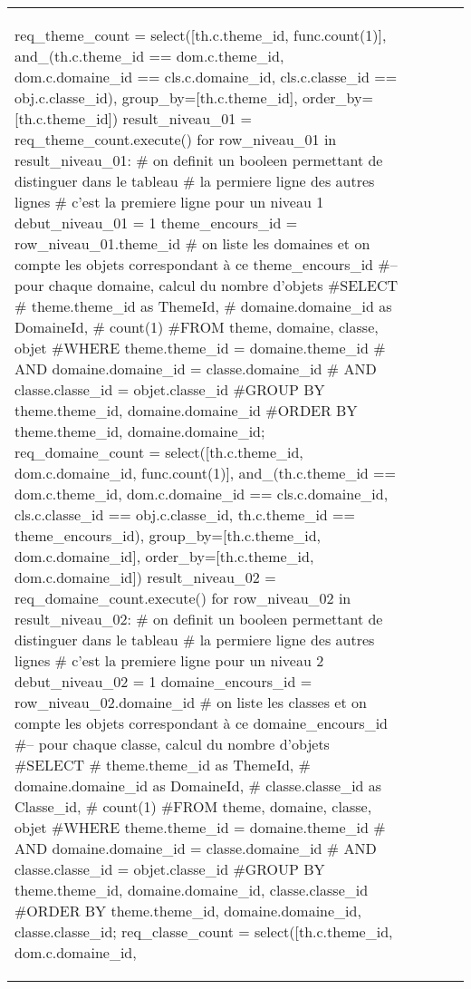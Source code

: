 \documentclass[12pt,titlepage,oneside]{book}
\begin{document}
\begin{supertabular}{|p{7.5cm}|p{7.5cm}|p{7.5cm}|c|p{10cm}|}
\begin{lbdpython}
req_theme_count = select([th.c.theme_id, func.count(1)],
                  and_(th.c.theme_id == dom.c.theme_id,
                       dom.c.domaine_id == cls.c.domaine_id,
                       cls.c.classe_id == obj.c.classe_id),
                  group_by=[th.c.theme_id],
                  order_by=[th.c.theme_id])
result_niveau_01 = req_theme_count.execute()
for row_niveau_01 in result_niveau_01:
   # on definit un booleen permettant de distinguer dans le tableau
   # la permiere ligne des autres lignes
   # c'est la premiere ligne pour un niveau 1
   debut_niveau_01 = 1
   theme_encours_id = row_niveau_01.theme_id
   # on liste les domaines et on compte les objets correspondant à ce theme_encours_id
   #-- pour chaque domaine, calcul du nombre d'objets
   #SELECT
   #   theme.theme_id as ThemeId,
   #   domaine.domaine_id as DomaineId,
   #   count(1)
   #FROM theme, domaine, classe, objet
   #WHERE theme.theme_id = domaine.theme_id
   #  AND domaine.domaine_id = classe.domaine_id
   #  AND classe.classe_id = objet.classe_id
   #GROUP BY theme.theme_id, domaine.domaine_id
   #ORDER BY theme.theme_id, domaine.domaine_id;
   req_domaine_count = select([th.c.theme_id, dom.c.domaine_id, func.count(1)],
                       and_(th.c.theme_id == dom.c.theme_id,
                            dom.c.domaine_id == cls.c.domaine_id,
                            cls.c.classe_id == obj.c.classe_id,
                            th.c.theme_id == theme_encours_id),
                       group_by=[th.c.theme_id, dom.c.domaine_id],
                       order_by=[th.c.theme_id, dom.c.domaine_id])
   result_niveau_02 = req_domaine_count.execute()
   for row_niveau_02 in result_niveau_02:
      # on definit un booleen permettant de distinguer dans le tableau
      # la permiere ligne des autres lignes
      # c'est la premiere ligne pour un niveau 2
      debut_niveau_02 = 1
      domaine_encours_id = row_niveau_02.domaine_id
      # on liste les classes et on compte les objets correspondant à ce domaine_encours_id
      #-- pour chaque classe, calcul du nombre d'objets
      #SELECT
      #   theme.theme_id as ThemeId,
      #   domaine.domaine_id as DomaineId,
      #   classe.classe_id as Classe_id,
      #   count(1)
      #FROM theme, domaine, classe, objet
      #WHERE theme.theme_id = domaine.theme_id 
      #  AND domaine.domaine_id = classe.domaine_id
      #  AND classe.classe_id = objet.classe_id
      #GROUP BY theme.theme_id, domaine.domaine_id, classe.classe_id
      #ORDER BY theme.theme_id, domaine.domaine_id, classe.classe_id;
      req_classe_count = select([th.c.theme_id, dom.c.domaine_id,

\end{lbdpython}
\end{supertabular}
\end{document}
